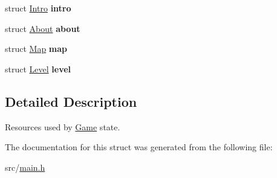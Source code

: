 \begin{DoxyCompactItemize}
\item 
\hypertarget{structGame_afcc0b09f19df8162100973a002509000}{struct \hyperlink{structIntro}{\-Intro} {\bfseries intro}}\label{structGame_afcc0b09f19df8162100973a002509000}

\item 
\hypertarget{structGame_a0f7f35de759c984c4b53c86fb0dcbd44}{struct \hyperlink{structAbout}{\-About} {\bfseries about}}\label{structGame_a0f7f35de759c984c4b53c86fb0dcbd44}

\item 
\hypertarget{structGame_aaab875b9e556df53251db40341046cab}{struct \hyperlink{structMap}{\-Map} {\bfseries map}}\label{structGame_aaab875b9e556df53251db40341046cab}

\item 
\hypertarget{structGame_aa258068886c6db9c88d73e07c7e114f2}{struct \hyperlink{structLevel}{\-Level} {\bfseries level}}\label{structGame_aa258068886c6db9c88d73e07c7e114f2}

\end{DoxyCompactItemize}


\subsection{\-Detailed \-Description}
\-Resources used by \hyperlink{structGame}{\-Game} state. 

\-The documentation for this struct was generated from the following file\-:\begin{DoxyCompactItemize}
\item 
src/\hyperlink{main_8h}{main.\-h}\end{DoxyCompactItemize}
